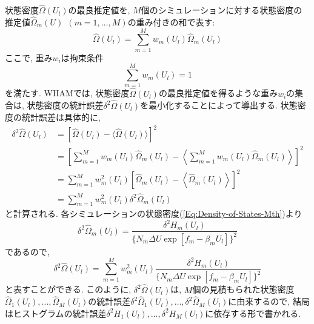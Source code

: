 状態密度$\hat{\Omega}(U_{l})$の最良推定値を, $M$個のシミュレーションに対する状態密度の推定値$\hat{\Omega}_{m}(U)~~(m = 1,\ldots, M)$の重み付きの和で表す:
\begin{equation}
    \hat{\Omega}(U_{l}) = \sum_{m=1}^{M} w_{m}(U_{l}) \hat{\Omega}_{m}(U_{l})
    \label{Eq:WHAM-Estimation-Density-of-States}
\end{equation}
ここで, 重み$w_{i}$は拘束条件
\begin{equation}
    \sum_{m=1}^{M} w_{m}(U_{l}) =1
    \label{Eq:WHAM-Weight-Constrain}
\end{equation}
を満たす. 
WHAMでは, 状態密度$\hat{\Omega}(U_{l})$の最良推定値を得るような重み$w_{i}$の集合は, 状態密度の統計誤差$\delta^{2}\hat{\Omega}(U_{l})$を最小化することによって導出する. 
状態密度の統計誤差は具体的に, 
\begin{align}
    \delta^{2}\hat{\Omega}(U_{l}) &=
    \left[\hat{\Omega}(U_{l}) - \langle \hat{\Omega}(U_{l}) \rangle \right]^{2}
    \\ &=
    \left[
        \sum_{m=1}^{M} w_{m}(U_{l}) \hat{\Omega}_{m}(U_{l}) -
        \left\langle \sum_{m=1}^{M} w_{m}(U_{l}) \hat{\Omega}_{m}(U_{l}) \right\rangle
    \right]^{2}
    \\ &=
    \sum_{m=1}^{M} w_{m}^{2}(U_{l})
    \left[
        \hat{\Omega}_{m}(U_{l}) -
        \left\langle \hat{\Omega}_{m}(U_{l}) \right\rangle
    \right]^{2}
    \\ &=
    \sum_{m=1}^{M} w_{m}^{2}(U_{l}) \delta^{2}\hat{\Omega}_{m}(U_{l})
\end{align}
と計算される. 各シミュレーションの状態密度(\ref{Eq:Density-of-States-Mth})より
\begin{equation}
    \delta^{2} \hat{\Omega}_{m}(U_{l}) =
    \frac{\delta^{2}H_{m}(U_{l})}{\{N_{m} \Delta U \exp[f_{m} -\beta_{m}U_{l}]\}^{2}}
    \label{Eq:WHAM-Density-of-State-Mth-Estimation}
\end{equation}
であるので, 
\begin{equation}
    \delta^{2}\hat{\Omega}(U_{l}) =
    \sum_{m=1}^{M} w_{m}^{2}(U_{l})
    \frac{\delta^{2}H_{m}(U_{l})}{\{N_{m} \Delta U \exp[f_{m} -\beta_{m}U_{l}]\}^{2}}
\end{equation}
と表すことができる. 
このように, $\delta^{2}\hat{\Omega}(U_{l})$は, $M$個の見積もられた状態密度$\hat{\Omega}_{1}(U_{l}),\ldots,\hat{\Omega}_{M}(U_{l})$の統計誤差$\delta^{2}\hat{\Omega}_{1}(U_{l}),\ldots,\delta^{2}\hat{\Omega}_{M}(U_{l})$に由来するので, 結局はヒストグラムの統計誤差$\delta^{2}H_{1}(U_{l}),\ldots,\delta^{2}H_{M}(U_{l})$に依存する形で書かれる. 
